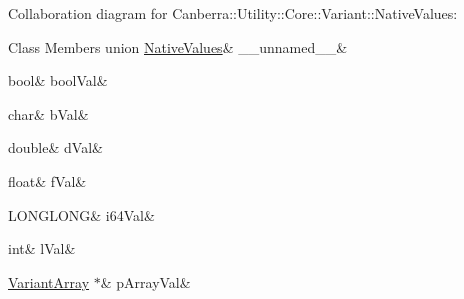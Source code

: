 Collaboration diagram for Canberra\+:\+:Utility\+:\+:Core\+:\+:Variant\+:\+:Native\+Values\+:
\begin{DoxyFields}{Class Members}
\mbox{\label{class_canberra_1_1_utility_1_1_core_1_1_variant_ad3cb9f168af1e6be3389abc604af7542}} 
union \hyperlink{class_canberra_1_1_utility_1_1_core_1_1_variant_d9/d8e/union_canberra_1_1_utility_1_1_core_1_1_variant_1_1_native_values_8____unnamed____}{NativeValues}&
\_\_unnamed\_\_&
\\
\hline

\mbox{\label{class_canberra_1_1_utility_1_1_core_1_1_variant_a26461e6bc445b5f553098aba58712bbe}} 
bool&
boolVal&
\\
\hline

\mbox{\label{class_canberra_1_1_utility_1_1_core_1_1_variant_a464bd89646061e595b7e6ca6ca8adadf}} 
char&
bVal&
\\
\hline

\mbox{\label{class_canberra_1_1_utility_1_1_core_1_1_variant_a373e8f4f962d91b6901f5d8237b45a28}} 
double&
dVal&
\\
\hline

\mbox{\label{class_canberra_1_1_utility_1_1_core_1_1_variant_a0b96f982251bb887df65ba73dda77640}} 
float&
fVal&
\\
\hline

\mbox{\label{class_canberra_1_1_utility_1_1_core_1_1_variant_a1edd1da715344ff3614fcbfa6e581ffd}} 
LONGLONG&
i64Val&
\\
\hline

\mbox{\label{class_canberra_1_1_utility_1_1_core_1_1_variant_aff1a7fd37d4bafdd725f2e96b5dfa819}} 
int&
lVal&
\\
\hline

\mbox{\label{class_canberra_1_1_utility_1_1_core_1_1_variant_abeb6ef3d4c81194677f6e241836c7d41}} 
\hyperlink{class_canberra_1_1_utility_1_1_core_1_1_variant_array}{VariantArray} $\ast$&
pArrayVal&
\\
\hline


\end{DoxyFields}
